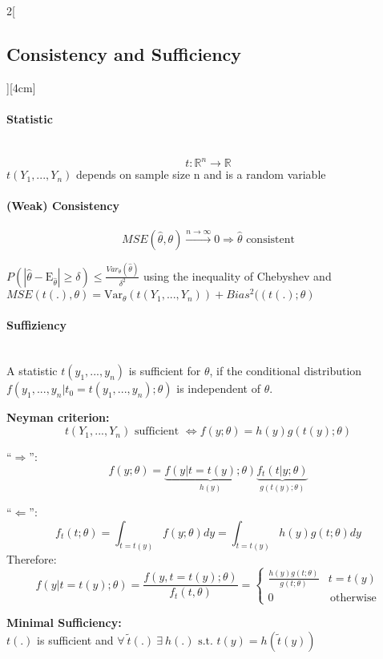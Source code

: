 \documentclass[8pt]{extarticle}
\begin{document}
\begin{multicols}{2}[\subsection{Consistency and Sufficiency}][4cm]

\paragraph{Statistic} \ \\
$$t: \mathbb{R}^n \rightarrow \mathbb{R}$$
$t(Y_1, ..., Y_n)$ depends on sample size n and is a random variable

\paragraph{(Weak) Consistency}
$$MSE(\hat{\theta},\theta) \overset{n\rightarrow\infty}{\longrightarrow} 0 \Rightarrow \hat{\theta} \text{ consistent}$$

\begin{Proof}
$P(|\hat{\theta} - \mathrm{E}_{\hat{\theta}}| \geq \delta) \leq \frac{Var_\theta(\hat{\theta})}{\delta^2}$ using the inequality of Chebyshev
and $MSE(t(.), \theta) = \mathrm{Var}_\theta\left(t(Y_1,...,Y_n)\right) + Bias^2((t(.); \theta)$
\end{Proof}

\paragraph{Suffiziency} \ \\
\noindent A statistic $t(y_1,...,y_n)$ is sufficient for $\theta$, if the conditional distribution $f(y_1,...,y_n|t_0 = t(y_1,...,y_n);\theta)$ is independent of $\theta$. \vspace{0.5em}

\textbf{Neyman criterion:}
$$t(Y_1,...,Y_n) \text{ sufficient } \Leftrightarrow f(y;\theta) = h(y)g\left(t(y);\theta\right)$$
\begin{Proof}
``$\Rightarrow$'':
$$f(y;\theta) = \underbrace{f(y|t = t(y);\theta)}_{h(y)} \underbrace{f_t(t|y;\theta)}_{g(t(y);\theta)}$$

\noindent ``$\Leftarrow$'':
$$f_t(t;\theta) = \int_{t=t(y)} f(y;\theta)dy = \int_{t=t(y)} h(y) g(t;\theta)dy$$
\indent Therefore:
$$f\left(y|t=t(y);\theta\right) = \frac{f(y,t=t(y);\theta)}{f_t(t,\theta)}
= \begin{cases}
\frac{h(y)g(t;\theta)}{g(t;\theta)} & t=t(y) \\
0 & \, \text{otherwise}
\end{cases}$$
\end{Proof}

\textbf{Minimal Sufficiency:} \ \\
$t(.)$ is sufficient and $\forall\: \tilde{t}(.)\: \exists\: h(.) \text{ s.t. } t(y) = h(\tilde{t}(y))$



\end{multicols}
\end{document}
